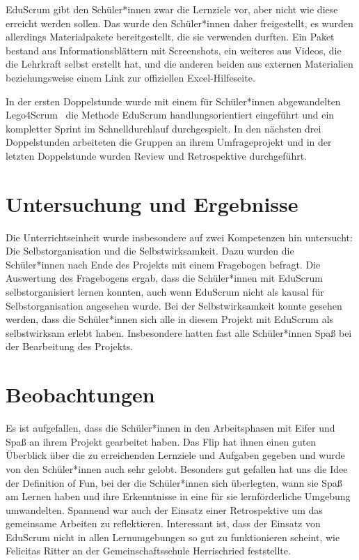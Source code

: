 \documentclass[twoside,twocolumn]{article}
\begin{document}
EduScrum gibt den Schüler*innen zwar die Lernziele vor, aber nicht wie diese erreicht werden sollen. Das wurde den Schüler*innen daher freigestellt, es wurden allerdings Materialpakete bereitgestellt, die sie verwenden durften. Ein Paket bestand aus Informationsblättern mit Screenshots, ein weiteres aus Videos, die die Lehrkraft selbst erstellt hat, und die anderen beiden aus externen Materialien beziehungsweise einem Link zur offiziellen Excel-Hilfeseite.

In der ersten Doppelstunde wurde mit einem für Schüler*innen abgewandelten Lego4Scrum~\cite{lego} die Methode EduScrum handlungsorientiert eingeführt und ein kompletter Sprint im Schnelldurchlauf durchgespielt. In den nächsten drei Doppelstunden arbeiteten die Gruppen an ihrem Umfrageprojekt und in der letzten Doppelstunde wurden Review und Retrospektive durchgeführt. 


\section{Untersuchung und Ergebnisse}

Die Unterrichtseinheit wurde insbesondere auf zwei Kompetenzen hin untersucht: Die Selbstorganisation und die Selbstwirksamkeit. Dazu wurden die Schüler*innen nach Ende des Projekts mit einem Fragebogen befragt. Die Auswertung des Fragebogens ergab, dass die Schüler*innen mit EduScrum selbstorganisiert lernen konnten, auch wenn EduScrum nicht als kausal für Selbstorganisation angesehen wurde. Bei der Selbstwirksamkeit konnte gesehen werden, dass die Schüler*innen sich alle in diesem Projekt mit EduScrum als selbstwirksam erlebt haben. Insbesondere hatten fast alle Schüler*innen Spaß bei der Bearbeitung des Projekts.

\section{Beobachtungen}

Es ist aufgefallen, dass die Schüler*innen in den Arbeitsphasen mit Eifer und Spaß an ihrem Projekt gearbeitet haben. Das Flip hat ihnen einen guten Überblick über die zu erreichenden Lernziele und Aufgaben gegeben und wurde von den Schüler*innen auch sehr gelobt. Besonders gut gefallen hat uns die Idee der Definition of Fun, bei der die Schüler*innen sich überlegten, wann sie Spaß am Lernen haben und ihre Erkenntnisse in eine für sie lernförderliche Umgebung umwandelten. Spannend war auch der Einsatz einer Retrospektive um das gemeinsame Arbeiten zu reflektieren. Interessant ist, dass der Einsatz von EduScrum nicht in allen Lernumgebungen so gut zu funktionieren scheint, wie Felicitas Ritter an der Gemeinschaftsschule Herrischried feststellte.
\end{document}

